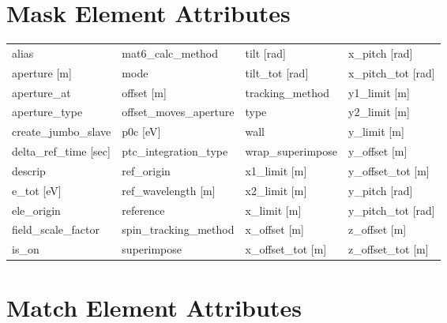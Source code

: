  \section{Mask Element Attributes}
 \label{s:list.mask}
 
 \begin{tabular}{llll} \toprule
alias                            & mat6_calc_method                 & tilt [rad]                       & x_pitch [rad]                    \\
aperture [m]                     & mode                             & tilt_tot [rad]                   & x_pitch_tot [rad]                \\
aperture_at                      & offset [m]                       & tracking_method                  & y1_limit [m]                     \\
aperture_type                    & offset_moves_aperture            & type                             & y2_limit [m]                     \\
create_jumbo_slave               & p0c [eV]                         & wall                             & y_limit [m]                      \\
delta_ref_time [sec]             & ptc_integration_type             & wrap_superimpose                 & y_offset [m]                     \\
descrip                          & ref_origin                       & x1_limit [m]                     & y_offset_tot [m]                 \\
e_tot [eV]                       & ref_wavelength [m]               & x2_limit [m]                     & y_pitch [rad]                    \\
ele_origin                       & reference                        & x_limit [m]                      & y_pitch_tot [rad]                \\
field_scale_factor               & spin_tracking_method             & x_offset [m]                     & z_offset [m]                     \\
is_on                            & superimpose                      & x_offset_tot [m]                 & z_offset_tot [m]                 \\
 \bottomrule
 \end{tabular}
 \vfill
 
 \section{Match Element Attributes}
 \label{s:list.match}
 
